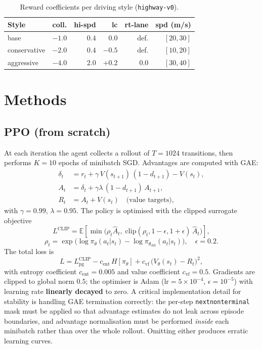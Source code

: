 \documentclass[conference]{IEEEtran}
\newcommand{\code}[1]{\texttt{#1}}
\begin{document}
\begin{table}[t]
\caption{Reward coefficients per driving style (\code{highway-v0}).}
\label{tab:reward}
\centering
\small
\begin{tabular}{@{}lrrrrr@{}}
\toprule
Style & coll. & hi-spd & lc & rt-lane & spd (m/s) \\
\midrule
base         & $-1.0$ & $0.4$ & $0.0$  & def. & $[20,30]$ \\
conservative & $-2.0$ & $0.4$ & $-0.5$ & def. & $[10,20]$ \\
aggressive   & $-4.0$ & $2.0$ & $+0.2$ & $0.0$ & $[30,40]$ \\
\bottomrule
\end{tabular}
\end{table}

\section{Methods}
\label{sec:methods}

\subsection{PPO (from scratch)}
At each iteration the agent collects a rollout of $T = 1024$ transitions, then
performs $K = 10$ epochs of minibatch SGD. Advantages are computed with GAE:
\begin{align}
\delta_t &= r_t + \gamma\, V(s_{t+1})\,(1 - d_{t+1}) - V(s_t), \\
A_t &= \delta_t + \gamma\lambda\,(1 - d_{t+1})\, A_{t+1}, \\
R_t &= A_t + V(s_t) \quad \text{(value targets)},
\end{align}
with $\gamma = 0.99$, $\lambda = 0.95$. The policy is optimised with the
clipped surrogate objective
\begin{equation}
L^{\mathrm{CLIP}} = \mathbb{E}\!\left[ \min\!\big( \rho_t \hat{A}_t,\;
\mathrm{clip}(\rho_t, 1-\epsilon, 1+\epsilon)\, \hat{A}_t \big) \right],
\end{equation}
\begin{equation}
\rho_t = \exp\!\big( \log \pi_\theta(a_t|s_t) - \log \pi_{\theta_{\mathrm{old}}}(a_t|s_t) \big), \quad \epsilon = 0.2.
\end{equation}
The total loss is
\begin{equation}
L = L^{\mathrm{CLIP}}_{\mathrm{pg}} - c_{\mathrm{ent}}\, H[\pi_\theta]
+ c_{\mathrm{vf}}\, \big( V_\theta(s_t) - R_t \big)^2,
\end{equation}
with entropy coefficient $c_{\mathrm{ent}} = 0.005$ and value coefficient
$c_{\mathrm{vf}} = 0.5$. Gradients are clipped to global norm $0.5$; the
optimiser is Adam ($\text{lr} = 5\times10^{-4}$, $\epsilon = 10^{-5}$) with
learning rate \textbf{linearly decayed} to zero. A critical implementation
detail for stability is handling GAE termination correctly: the per-step
\code{nextnonterminal} mask must be applied so that advantage estimates do not
leak across episode boundaries, and advantage normalisation must be performed
\emph{inside} each minibatch rather than over the whole rollout. Omitting either
produces erratic learning curves.
\end{document}
